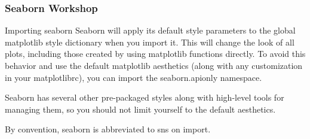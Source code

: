 \begin{frame}
\frametitle{Seaborn Workshop}
\large

Importing seaborn
Seaborn will apply its default style parameters to the global matplotlib style dictionary when you import it. This will change the look of all plots, including those created by using matplotlib functions directly. To avoid this behavior and use the default matplotlib aesthetics (along with any customization in your matplotlibrc), you can import the seaborn.apionly namespace.

Seaborn has several other pre-packaged styles along with high-level tools for managing them, so you should not limit yourself to the default aesthetics.

By convention, seaborn is abbreviated to sns on import.
\end{frame}
